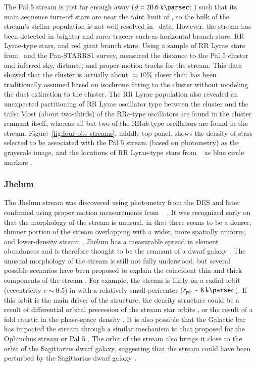 \documentclass[final,5p,times,twocolumn,authoryear]{elsarticle}
\begin{document}
The Pal 5 stream is just far enough away ($d = 20.6~\kpc$; \citealt{price-whelan:2019})
such that its main sequence turn-off stars are near the faint limit of \gaia, so the
bulk of the stream's stellar population is not well resolved in \gaia\ data.
However, the stream has been detected in brighter and rarer tracers such as horizontal
branch stars, RR Lyrae-type stars, and red giant branch stars.
Using a sample of RR Lyrae stars from \gaia\ and the Pan-STARRS1 survey,
\citet{price-whelan:2019} measured the distance to the Pal 5 cluster and inferred sky,
distance, and proper-motion tracks for the stream.
This data showed that the cluster is actually about $\approx 10\%$ closer than has been
traditionally assumed based on isochrone fitting to the cluster without modeling the
dust extinction to the cluster.
The RR Lyrae population also revealed an unexpected partitioning of RR Lyrae oscillator
type between the cluster and the tails:
Most (about two-thirds) of the RR$c$-type oscillators are found in the cluster remnant
itself, whereas all but two of the RR$ab$-type oscillators are found in the stream.
Figure~\ref{fig:four-obs-streams}, middle top panel, shows the density of stars selected
to be associated with the Pal 5 stream (based on photometry) as the grayscale image, and
the locations of RR Lyrae-type stars from \gaia\  as blue circle markers
\citep{price-whelan:2019}.


\subsubsection{Jhelum}
\label{sec:jhelum}

The Jhelum stream \citep{shipp:2018} was discovered using photometry from the DES and
later confirmed using proper motion measurements from \gaia\  \citep{shipp:2019}.
It was recognized early on that the morphology of the stream is unusual, in that there
seems to be a denser, thinner portion of the stream overlapping with a wider, more
spatially uniform, and lower-density stream \citep{bonaca:2019}.
Jhelum has a measurable spread in element abundances \citep{ji:2020, li:2022} and is
therefore thought to be the remnant of a dwarf galaxy \citep{sheffield:2021}.
The unusual morphology of the stream is still not fully understood, but several possible
scenarios have been proposed to explain the coincident thin and thick components of the
stream \citep[see, e.g., the discussion Section~5 of ][]{bonaca:2019}.
For example, the stream is likely on a  radial orbit (eccentricity $e \sim 0.5$) in
with a relatively small pericenter ($\rper \sim 8~\kpc$): If this orbit is the
main driver of the structure, the density structure could be a result of differential
orbital precession of the stream star orbits \citep{erkal:2016b}, or the result of a
fold caustic in the phase-space density \citep{tremaine:1999}.
It is also possible that the Galactic bar has impacted the stream through a similar
mechanism to that proposed for the Ophiuchus stream \citep{price-whelan:2016b} or Pal 5
\citep{pearson:2017}.
The orbit of the stream also brings it close to the orbit of the Sagittarius dwarf
galaxy, suggesting that the stream could have been perturbed by the Sagittarius dwarf
galaxy \citep{woudenberg:2023}.
\end{document}

